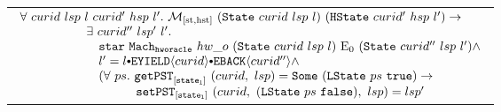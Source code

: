 \begin{lemma}
\begin{tabular}{P{0.95\textwidth}}
$
\begin{array}{l}
\forall \ curid \ lsp \ l \ curid' \ hsp \ l' . \ \matchstatehstate{(\mcstate{curid}{lsp}{l})}{(\hstate{curid'}{hsp}{l'})} \rightarrow \\
\ \ \ \ \ \ \ \ \ \ \ \ \ \ \ \  \exists \ curid'' \ lsp' \ l'  . \ \\
\ \ \ \ \ \ \ \ \ \ \ \ \ \ \ \  \ \ \ \ccstarstep{\oraclestep{hw\_o}{(\mcstate{curid}{lsp}{l})}{\ccemptytrace}{(\mcstate{curid''}{lsp}{l'})}} \wedge\\
\ \ \ \ \ \ \ \ \ \ \ \ \ \ \ \  \ \ \ l' = \listconsoppo{\yieldbackev{curid''}}{\listconsoppo{\yieldev{curid}}{l}} \wedge\\
\ \ \ \ \ \ \ \ \ \ \ \ \ \ \ \  \ \ \ (\forall \ ps  . \ \getpstsome{\localstatekwd}{curid}{lsp}{(\localstate{ps}{\btrue})} \rightarrow \\
\ \ \ \ \ \ \ \ \ \ \ \ \ \ \ \  \ \ \ \ \ \ \ \ \ \  \ \ \setpst{\localstatekwd}{curid}{(\localstate{ps}{\bfalse})}{lsp}{lsp'} \\
\end{array}
$
\end{tabular}
\end{lemma}



